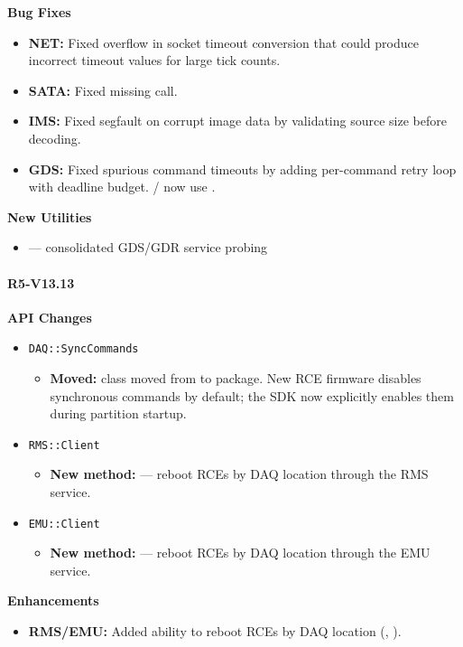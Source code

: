 \noindent\textbf{Bug Fixes}\par\nobreak
\begin{itemize}\compactlist
  \item \textbf{NET:} Fixed  overflow in socket timeout conversion that
    could produce incorrect timeout values for large tick counts.
  \item \textbf{SATA:} Fixed  missing  call.
  \item \textbf{IMS:} Fixed  segfault on corrupt image data by validating
    source size before decoding.
  \item \textbf{GDS:} Fixed spurious command timeouts by adding per-command retry
    loop with deadline budget. / now use .
\end{itemize}

\noindent\textbf{New Utilities}\par\nobreak
\begin{itemize}\compactlist
  \item {} --- consolidated GDS/GDR service probing
\end{itemize}


\paragraph{R5-V13.13}

\noindent\textbf{API Changes}\par\nobreak
\begin{itemize}\compactlist
  \item \texttt{DAQ::SyncCommands}
  \begin{itemize}\compactlist
    \item \textbf{Moved:}  class moved from  to  package.
      New RCE firmware disables synchronous commands by default; the SDK
      now explicitly enables them during partition startup.
  \end{itemize}
  \item \texttt{RMS::Client}
  \begin{itemize}\compactlist
    \item \textbf{New method:}  --- reboot RCEs by DAQ location through
      the RMS service.
  \end{itemize}
  \item \texttt{EMU::Client}
  \begin{itemize}\compactlist
    \item \textbf{New method:}  --- reboot RCEs by DAQ location through
      the EMU service.
  \end{itemize}
\end{itemize}
\noindent\textbf{Enhancements}\par\nobreak
\begin{itemize}\compactlist
  \item \textbf{RMS/EMU:} Added ability to reboot RCEs by DAQ location
    (, ).
\end{itemize}


